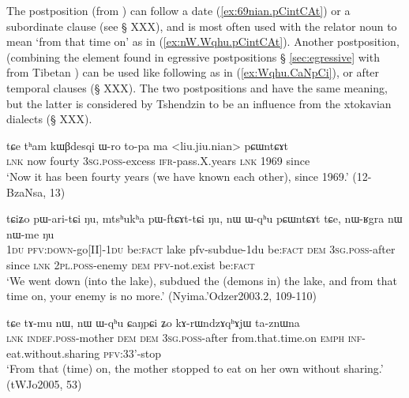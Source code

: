 The postposition  (from ) can follow a date (\ref{ex:69nian.pCintCAt}) or a subordinate clause (see § XXX), and is most often used with the relator noun  to mean `from that time on' as in (\ref{ex:nW.Wqhu.pCintCAt}). Another postposition,   (combining the  element found in egressive postpositions § \ref{sec:egressive}  with  from Tibetan ) can be used like  following   as in (\ref{ex:Wqhu.CaNpCi}), or after temporal clauses (§ XXX). The two postpositions  and  have the same meaning, but the latter is considered by Tshendzin to be an influence from the xtokavian dialects (§ XXX).

 \begin{exe}
\ex \label{ex:69nian.pCintCAt}
 \gll tɕe tʰam kɯβdesqi ɯ-ro to-pa ma <liu.jiu.nian> pɕɯntɕɤt \\
 \textsc{lnk} now fourty \textsc{3sg}.\textsc{poss}-excess \textsc{ifr}-pass.X.years \textsc{lnk}  1969 since \\
 \glt `Now it has been fourty years (we have known each other), since 1969.' (12-BzaNsa, 13)
 \end{exe}
 
  \begin{exe}
\ex \label{ex:nW.Wqhu.pCintCAt}
 \gll  tɕiʑo pɯ-ari-tɕi ŋu, mtsʰukʰa pɯ-ftɕɤt-tɕi ŋu, nɯ ɯ-qʰu pɕɯntɕɤt tɕe,  nɯ-ʁgra nɯ nɯ-me ŋu \\
 \textsc{1du} \textsc{pfv}:\textsc{down}-go[II]-\textsc{1du} be:\textsc{fact} lake pfv-subdue-1du be:\textsc{fact} \textsc{dem} \textsc{3sg}.\textsc{poss}-after since \textsc{lnk} \textsc{2pl}.\textsc{poss}-enemy \textsc{dem} \textsc{pfv}-not.exist be:\textsc{fact} \\
 \glt `We went down (into the lake), subdued the (demons in) the lake, and from that time on, your enemy is no more.' (Nyima.'Odzer2003.2, 109-110)
 \end{exe}
 
 \begin{exe}
\ex \label{ex:Wqhu.CaNpCi}
\gll  tɕe tɤ-mu nɯ, nɯ ɯ-qʰu ɕaŋpɕi ʑo kɤ-rɯndzɤqʰɤjɯ ta-znɯna \\
\textsc{lnk} \textsc{indef}.\textsc{poss}-mother \textsc{dem} \textsc{dem} \textsc{3sg}.\textsc{poss}-after from.that.time.on \textsc{emph} \textsc{inf}-eat.without.sharing \textsc{pfv}:3\fl{}3'-stop \\
\glt `From that (time) on, the mother stopped to eat on her own without sharing.' (tWJo2005, 53) 
\end{exe}

